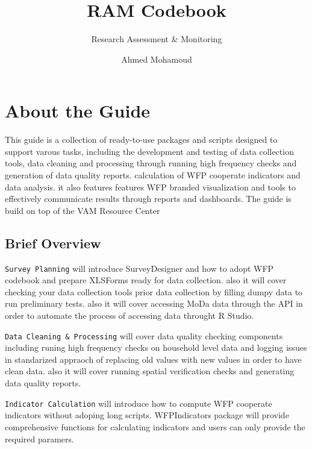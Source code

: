 \documentclass[
  letterpaper,
  DIV=11,
  numbers=noendperiod]{scrreprt}
\title{RAM Codebook}
\subtitle{Research Assessment \& Monitoring}
\author{Ahmed Mohamoud}
\date{}
\renewcommand*\contentsname{Table of contents}
\newcommand\contentsname{Table of contents}
\begin{document}
\maketitle

\renewcommand*\contentsname{Table of contents}
{
\hypersetup{linkcolor=}
\setcounter{tocdepth}{2}
\tableofcontents
}


\chapter*{About the Guide}\label{about-the-guide}


This guide is a collection of ready-to-use packages and scripts designed
to support varous tasks, including the development and testing of data
collection tools, data cleaning and processing through running high
frequency checks and generation of data quality reports. calculation of
WFP cooperate indicators and data analysis. it also features features
WFP branded visualization and tools to effectively communicate results
through reports and dashboards. The guide is build on top of the VAM
Resource Center

\section*{Brief Overview}\label{brief-overview}


\texttt{Survey\ Planning} will introduce SurveyDesigner and how to adopt
WFP codebook and prepare XLSForms ready for data collection. also it
will cover checking your data collection tools prior data collection by
filling dumpy data to run preliminary tests. also it will cover
accessing MoDa data through the API in order to automate the process of
accessing data throught R Studio.

\texttt{Data\ Cleaning\ \&\ Processing} will cover data quality checking
components including runing high frequency checks on household level
data and logging issues in standarized appraoch of replacing old values
with new values in order to have clean data. also it will cover running
spatial verification checks and generating data quality reports.

\texttt{Indicator\ Calculation} will introduce how to compute WFP
cooperate indicators without adoping long scripts. WFPIndicators package
will provide comprehensive functions for calculating indicators and
users can only provide the required paramers.
\end{document}
